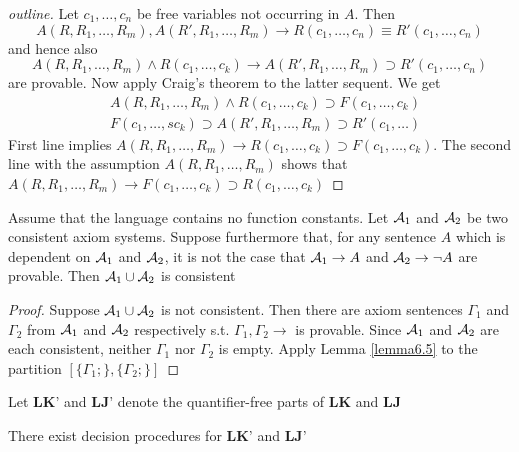\documentclass[11pt]{article}
\def \LJ {\textbf{LJ}}
\def \LK {\textbf{LK}}
\def \LKp {\textbf{LK'}}
\def \LJp {\textbf{LJ'}}
\begin{document}
\begin{proof}[outline]
Let \(c_1,\dots,c_n\) be free variables not occurring in \(A\). Then
\begin{equation*}
A(R,R_1,\dots,R_m),A(R',R_1,\dots,R_m)\to
R(c_1,\dots,c_n)\equiv R'(c_1,\dots,c_n)
\end{equation*}
and hence also
\begin{equation*}
A(R,R_1,\dots,R_m)\wedge R(c_1,\dots,c_k)\to A(R',R_1,\dots,R_m)\supset R'(c_1,\dots,c_n)
\end{equation*}
are provable. Now apply Craig's theorem to the latter sequent. We get
\begin{align*}
&A(R,R_1,\dots,R_m)\wedge R(c_1,\dots,c_k)\supset F(c_1,\dots,c_k)\\
&F(c_1,\dots,sc_k)\supset A(R',R_1,\dots,R_m)\supset R'(c_1,\dots)
\end{align*}
First line implies \(A(R,R_1,\dots,R_m)\to R(c_1,\dots,c_k)\supset F(c_1,\dots,c_k)\). The second line
with the assumption \(A(R,R_1,\dots,R_m)\) shows that
\(A(R,R_1,\dots,R_m)\to F(c_1,\dots,c_k)\supset R(c_1,\dots,c_k)\)
\end{proof}

\begin{proposition}[Robinson]
Assume that the language contains no function constants. Let \(\mathcal{A}_1\) and \(\mathcal{A}_2\) be two
consistent axiom systems. Suppose furthermore that, for any sentence \(A\) which is dependent
on \(\mathcal{A}_1\) and \(\mathcal{A}_2\), it is not the case that \(\mathcal{A}_1\to A\) and \(\mathcal{A}_2\to\neg A\)
are provable. Then \(\mathcal{A}_1\cup\mathcal{A}_2\) is consistent
\end{proposition}

\begin{proof}
Suppose \(\mathcal{A}_1\cup\mathcal{A}_2\) is not consistent. Then there are axiom sentences \(\Gamma_1\)
and \(\Gamma_2\) from \(\mathcal{A}_1\) and \(\mathcal{A}_2\) respectively s.t. \(\Gamma_1,\Gamma_2\to\) is
provable. Since \(\mathcal{A}_1\) and \(\mathcal{A}_2\) are each consistent, neither \(\Gamma_1\)
nor \(\Gamma_2\) is empty. Apply Lemma \ref{lemma6.5} to the partition \([\{\Gamma_1;\},\{\Gamma_2;\}]\)
\end{proof}

Let \(\LKp\) and \(\LJp\) denote the quantifier-free parts of \(\LK\) and \(\LJ\)

\begin{theorem}[]
There exist decision procedures for \(\LKp\) and \(\LJp\)
\end{theorem}
\end{document}
